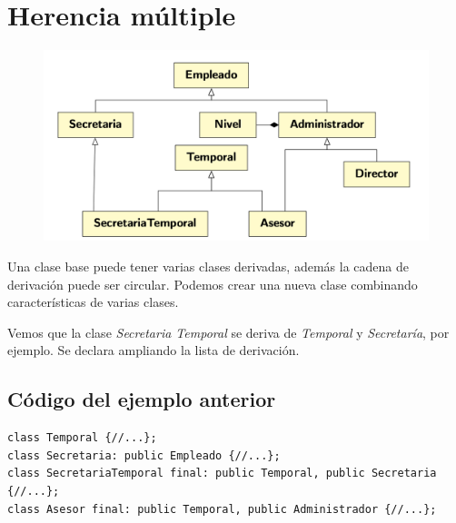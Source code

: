 \section{Herencia múltiple}
\vspace{-0.55cm}
\begin{center}
	\begin{figure}[h]
	\centering
	\includegraphics[width=\textwidth]{Imagenes/gen7.png}
\end{figure}
\end{center}
Una clase base puede tener varias clases derivadas, además la cadena de derivación puede ser circular. Podemos crear una nueva clase combinando características de varias clases.

Vemos que la clase \textit{Secretaria Temporal} se deriva de \textit{Temporal} y \textit{Secretaría}, por ejemplo.
Se declara ampliando la lista de derivación.
\newpage
\subsection{Código del ejemplo anterior}
\begin{center}
	\begin{lstlisting}[frame=single]
class Temporal {//...};
class Secretaria: public Empleado {//...};
class SecretariaTemporal final: public Temporal, public Secretaria {//...};
class Asesor final: public Temporal, public Administrador {//...};
\end{lstlisting}
\end{center}

